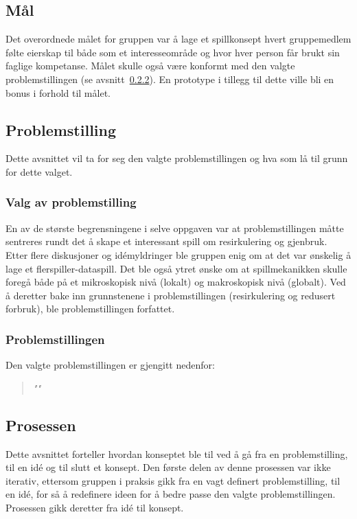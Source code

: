 \subsection{Mål}
Det overordnede målet for gruppen var å lage et spillkonsept hvert
gruppemedlem følte eierskap til både som et interesseområde og hvor hver person får brukt sin faglige kompetanse. Målet skulle også være konformt med den valgte
problemstillingen (se avsnitt~\ref{sec:problemstilling}). En prototype i
tillegg til dette ville bli en bonus i forhold til målet.

\subsection{Problemstilling}
\label{sec:problemstilling}
Dette avsnittet vil ta for seg den valgte problemstillingen og hva som
lå til grunn for dette valget.
\subsubsection{Valg av problemstilling}
En av de største begrensningene i selve oppgaven var at
problemstillingen måtte sentreres rundt det å skape et interessant spill
om resirkulering og gjenbruk. Etter flere diskusjoner og idémyldringer ble gruppen
enig om at det var ønskelig å lage et flerspiller-dataspill.
Det ble også ytret ønske om at spillmekanikken skulle foregå både på et
mikroskopisk nivå (lokalt) og makroskopisk nivå (globalt). Ved å
deretter bake inn grunnstenene i problemstillingen (resirkulering og
redusert forbruk), ble problemstillingen forfattet.
\subsubsection{Problemstillingen}\label{sec:problemstilling}
Den valgte problemstillingen er gjengitt nedenfor:
\begin{quotation}
\large\emph{""}
\end{quotation}
\subsection{Prosessen}
Dette avsnittet forteller hvordan konseptet ble til ved å gå fra en
problemstilling, til en idé og til slutt et konsept. Den første delen av
denne prosessen var ikke iterativ, ettersom gruppen i praksis gikk fra
en vagt definert problemstilling, til en idé, for så å redefinere ideen
for å bedre passe den valgte problemstillingen. Prosessen gikk deretter
fra idé til konsept. 
